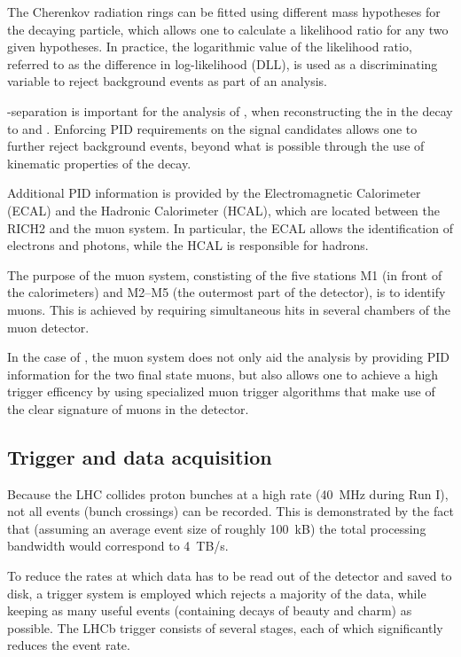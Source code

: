 The Cherenkov radiation rings can be fitted using different mass hypotheses for the decaying particle, which allows one to calculate a likelihood ratio for any two given hypotheses.
In practice, the logarithmic value of the likelihood ratio, referred to as the difference in log-likelihood (DLL), is used as a discriminating variable to reject background events as part of an analysis.

\PK-\Pgp separation is important for the analysis of \decay, when reconstructing the \APDzero in the decay to \PKp and \Pgpm.
Enforcing \gls{PID} requirements on the signal candidates allows one to further reject background events, beyond what is possible through the use of kinematic properties of the decay.

Additional PID information is provided by the Electromagnetic Calorimeter (ECAL) and the Hadronic Calorimeter (HCAL), which are located between the RICH2 and the muon system.
In particular, the ECAL allows the identification of electrons and photons, while the HCAL is responsible for hadrons.

The purpose of the muon system, constisting of the five stations M1 (in front of the calorimeters) and M2--M5 (the outermost part of the detector), is to identify muons.
This is achieved by requiring simultaneous hits in several chambers of the muon detector.

In the case of \decay, the muon system does not only aid the analysis by providing \gls{PID} information for the two final state muons, but also allows one to achieve a high trigger efficency by using specialized muon trigger algorithms that make use of the clear signature of muons in the detector.

\subsection{Trigger and data acquisition}

Because the LHC collides proton bunches at a high rate (\SI{40}{MHz} during Run I), not all events (bunch crossings) can be recorded.
This is demonstrated by the fact that (assuming an average event size of roughly \SI{100}{kB}) the total processing bandwidth would correspond to \SI{4}{TB/s}.

To reduce the rates at which data has to be read out of the detector and saved to disk, a trigger system is employed which rejects a majority of the data, while keeping as many useful events (containing decays of beauty and charm) as possible.
The LHCb trigger consists of several stages, each of which significantly reduces the event rate.

